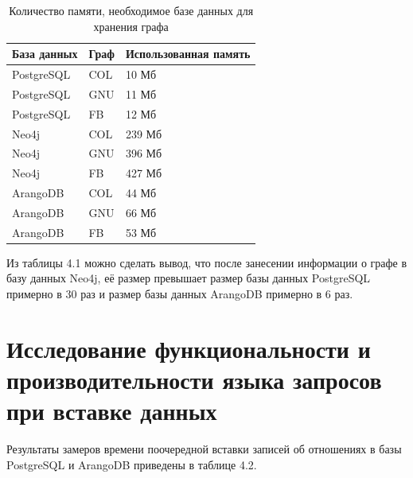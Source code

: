\begin{table} [htbp]
    \centering\small
    \caption{Количество памяти, необходимое базе данных для хранения графа}
    \begin{tabular}{|l|l|p{3cm}|}
        \hline
        База данных & Граф & Использованная память \\ \hline
        PostgreSQL  & COL  & 10 Мб                 \\ \hline
        PostgreSQL  & GNU  & 11 Мб                 \\ \hline
        PostgreSQL  & FB   & 12 Мб                 \\ \hline
        Neo4j       & COL  & 239 Мб                \\ \hline
        Neo4j       & GNU  & 396 Мб                \\ \hline
        Neo4j       & FB   & 427 Мб                \\ \hline
        ArangoDB    & COL  & 44 Мб                 \\ \hline
        ArangoDB    & GNU  & 66 Мб                 \\ \hline
        ArangoDB    & FB   & 53 Мб                 \\ \hline
    \end{tabular}
    \normalsize
\end{table}

Из таблицы 4.1 можно сделать вывод, что после занесении информации о графе в базу данных Neo4j, её размер превышает размер базы данных PostgreSQL примерно в 30 раз и размер базы данных ArangoDB примерно в 6 раз.


\section{Исследование функциональности и производительности языка запросов при вставке данных}

Результаты замеров времени поочередной вставки записей об отношениях в базы PostgreSQL и ArangoDB приведены в таблице 4.2.

